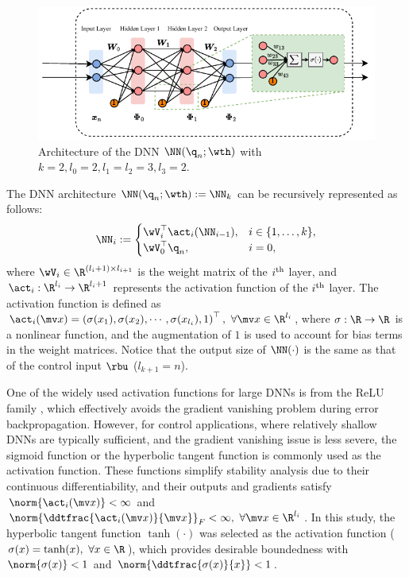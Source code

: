 \documentclass[lettersize,journal]{IEEEtran}
\begin{document}
\begin{figure}[t]
    \centering
    \includegraphics[width=0.99\linewidth]{src/figures/DNN.drawio.pdf}
    \caption{
        Architecture of the DNN $\NN({\q}_n;\wth)$ with $k=2,l_0=2,l_1=l_2=3,l_3=2$.
    }
    \label{fig:DNN}
\end{figure}

The DNN architecture $\NN({\q}_n;\wth) := \NN_k$ can be recursively represented as follows:
\begin{equation}
    \NN_i :=
    \begin{cases}
        \wV_i^\top \act_i(\NN_{i-1}), 
        &
        i\in\{1,\dots,k\},
        \\
        \wV_0^\top {\q}_n,
        &
        i=0
        ,
    \end{cases}
    \label{eq:DNN:architecture}
\end{equation}
where $\wV_i\in\R^{(l_i+1)\times l_{i+1}}$ is the weight matrix of the $i\textsuperscript{th}$ layer, and $\act_i: \R^{l_i}\to\R^{l_i+1}$ represents the activation function of the $i\textsuperscript{th}$ layer. 
The activation function is defined as $\act_i(\mv x)=\left(\sigma(x_1),\sigma(x_2),\cdots, \sigma(x_{l_{i}}), 1\right)^\top,\ \forall\mv x\in\R^{l_i}$, where $\sigma: \R\to\R$ is a nonlinear function, and the augmentation of $1$ is used to account for bias terms in the weight matrices. 
Notice that the output size of $\NN(\cdot)$ is the same as that of the control input $\rbu$ (\ie $l_{k+1}=n$). 


One of the widely used activation functions for large DNNs is from the ReLU family \cite{Maas:2013aa}, which effectively avoids the gradient vanishing problem during error backpropagation. 
However, for control applications, where relatively shallow DNNs are typically sufficient, and the gradient vanishing issue is less severe, the sigmoid function or the hyperbolic tangent function is commonly used as the activation function. 
These functions simplify stability analysis due to their continuous differentiability, and their outputs and gradients satisfy $\norm{\act_i(\mv x)} < \infty$ and  $\norm{\ddtfrac{\act_i(\mv x)}{\mv x}}_F < \infty,\ \forall\mv x\in\R^{l_i}$. 
In this study, the hyperbolic tangent function $\tanh(\cdot)$ was selected as the activation function (\ie $\sigma(x) = \tanh(x),\ \forall x\in\R$), which provides desirable boundedness with $\norm{\sigma(x)}<1$ and $\norm{\ddtfrac{\sigma(x)}{x}}< 1$.
\end{document}
